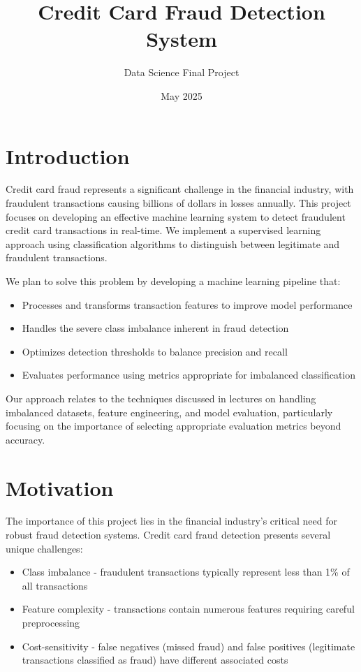 \documentclass{article}
\title{Credit Card Fraud Detection System}
\author{Data Science Final Project}
\date{May 2025}
\begin{document}
\maketitle

\section{Introduction}
Credit card fraud represents a significant challenge in the financial industry, with fraudulent transactions causing billions of dollars in losses annually. This project focuses on developing an effective machine learning system to detect fraudulent credit card transactions in real-time. We implement a supervised learning approach using classification algorithms to distinguish between legitimate and fraudulent transactions.

We plan to solve this problem by developing a machine learning pipeline that:
\begin{itemize}
    \item Processes and transforms transaction features to improve model performance
    \item Handles the severe class imbalance inherent in fraud detection
    \item Optimizes detection thresholds to balance precision and recall
    \item Evaluates performance using metrics appropriate for imbalanced classification
\end{itemize}

Our approach relates to the techniques discussed in lectures on handling imbalanced datasets, feature engineering, and model evaluation, particularly focusing on the importance of selecting appropriate evaluation metrics beyond accuracy.

\section{Motivation}
The importance of this project lies in the financial industry's critical need for robust fraud detection systems. Credit card fraud detection presents several unique challenges:
\begin{itemize}
    \item Class imbalance - fraudulent transactions typically represent less than 1\% of all transactions
    \item Feature complexity - transactions contain numerous features requiring careful preprocessing
    \item Cost-sensitivity - false negatives (missed fraud) and false positives (legitimate transactions classified as fraud) have different associated costs
\end{itemize}
\end{document}
